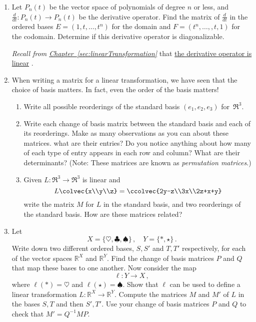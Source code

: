 


\begin{enumerate}
\item Let $P_n(t)$ be the vector space of polynomials of degree $n$ or less, and $\frac{d}{dt} \colon P_n(t) \to P_{n}(t)$ be the derivative operator.  Find the matrix of $\frac{d}{dt}$ in the ordered bases $E=(1,t,\ldots,t^n )$ for the domain and $F=(t^{n}, \ldots, ,t,1 )$ for the codomain. Determine if this derivative operator is diagonalizable. 

\emph{Recall from 
\hyperref[sec:linearTransformation]{Chapter~\ref*{sec:linearTransformation}}} 
that \hyperlink{derivative_linear}{the derivative operator is linear} .


\item When writing a matrix for a linear transformation, we have seen that the choice of basis matters.  In fact, even the order of the basis matters!
\begin{enumerate}
\item Write all possible reorderings of the standard basis $(e_1,e_2,e_3)$ for~$\Re^3$.
\item Write each change of basis matrix between the standard basis and each of its reorderings.  Make as many observations as you can about these matrices. what are their entries? Do you notice anything about how many of each type of entry appears in each row and column? What are their determinants?  (Note: These matrices are known as \emph{permutation matrices}.)
\item Given $L:\Re^3\to \Re^3$ is linear and  
$$
L\colvec{x\\y\\z}=\ccolvec{2y-z\\3x\\2z+x+y}
$$ 
write the matrix $M$ for $L$ in the standard basis, and two reorderings of the standard basis.  How are these matrices related?
\end{enumerate}


\item Let $$X=\{\heartsuit,\clubsuit,\spadesuit\}\, ,\quad Y=\{*,\star\}\, .$$ Write down two different ordered bases, $S,S'$ and $T,T'$ respectively, for each of the vector spaces ${\mathbb R}^X$ and ${\mathbb R}^Y$. Find the change of basis matrices $P$ and $Q$ that map these bases to one another. Now consider the map
$$
\ell:Y\to X\, ,
$$
where $\ell(*)=\heartsuit$ and $\ell(\star)=\spadesuit$. Show that $\ell$ can be used to define a linear transformation $L:{\mathbb R}^X\to{\mathbb R}^Y$. Compute the matrices $M$ and $M'$ of $L$ in the bases $S,T$ and then $S',T'$. Use your change of basis matrices $P$ and $Q$ to 
check that $M'=Q^{-1}MP$.


\end{enumerate}
